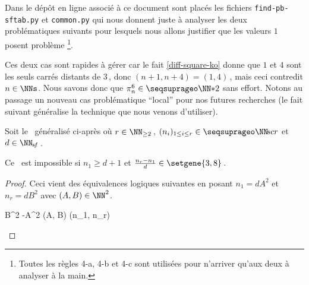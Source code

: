 Dans le dépôt en ligne associé à ce document sont placés les fichiers \verb#find-pb-sftab.py# et \verb#common.py# qui nous donnent juste à analyser les deux \sftab[x] problématiques suivants pour lesquels nous allons justifier que les valeurs $1$ posent problème
\footnote{
	Toutes les règles 4-a, 4-b et 4-c sont utilisées pour n'arriver qu'aux deux \sftab[x] à analyser à la main.
}.
%
\begin{center}
\end{center}


Ces deux cas sont rapides à gérer car le fait \ref{diff-square-ko} donne que $1$ et $4$ sont les seuls carrés distants de $3$\,, donc $(n+1, n+4) = (1, 4)$\,, mais ceci contredit $n \in \NNs$. Nous savons donc que $\consprod<6> \in \NNssquare$ sans effort.
Notons au passage un nouveau cas problématique \enquote{local} pour nos futures recherches (le fait suivant généralise la technique que nous venons d'utiliser).


\newpage
\begin{fact} \label{sftable-illegal-1-sol}
	Soit le \sftab\ généralisé ci-après où
	$r \in \NN_{\geq 2}$\,,
	$( n_i )_{1 \leq i \leq r} \in \NNseq[r]$
	et
	$d \in \NNsf$\,.

    \begin{center}
    \end{center}

	Ce \sftab\ est impossible si $n_1 \geq d+1$
	et
	$\frac{n_r - n_1}{d} \in \setgene{3, 8}$\,.
\end{fact}


\begin{proof}
	Ceci vient des équivalences logiques suivantes en posant $n_1 = d A^2$ et $n_r = d B^2$ avec $(A, B) \in \NN^2$.
	
	\medskip
	\begin{stepcalc}[style=ar*, ope={\iff}]
		 \in {}
	\explnext{}
		B^2 -A^2 \in {}
		(A, B) \in {}
	\explnext{}
		(n_1, n_r) \in {}
	\end{stepcalc}
\end{proof}


